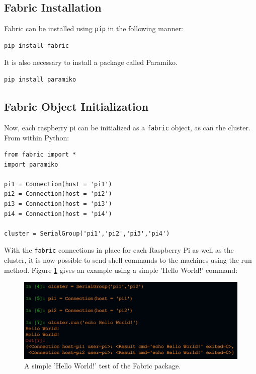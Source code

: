 \documentclass[sigconf]{acmart}
\begin{document}
\subsection{Fabric Installation}

Fabric can be installed using {\tt pip} in the following manner:

\begin{lstlisting}
pip install fabric
\end{lstlisting}
It is also necessary to install a package called Paramiko.
\begin{lstlisting}
pip install paramiko
\end{lstlisting}

\subsection{Fabric Object Initialization}

Now, each raspberry pi can be initialized as a {\tt fabric} object, as can the cluster. From within Python:

\begin{lstlisting}
from fabric import *
import paramiko

pi1 = Connection(host = 'pi1')
pi2 = Connection(host = 'pi2')
pi3 = Connection(host = 'pi3')
pi4 = Connection(host = 'pi4')

cluster = SerialGroup('pi1','pi2','pi3','pi4')

\end{lstlisting}

With the {\tt fabric} connections in place for each Raspberry Pi as well as the cluster, it is now possible to send shell commands to the machines using the run method. Figure \ref{f:fabricTest} gives an example using a simple 'Hello World!' command:

\begin{figure}[!ht]
  \centering\includegraphics[width=\columnwidth]{images/fabricTest.png}
  \caption{A simple 'Hello World!' test of the Fabric package.}\label{f:fabricTest}
\end{figure}
\end{document}
